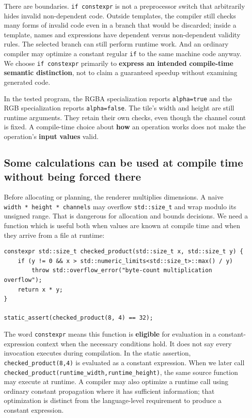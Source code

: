 There are boundaries. \texttt{if\ constexpr} is not a preprocessor switch that arbitrarily hides invalid non-dependent code. Outside templates, the compiler still checks many forms of invalid code even in a branch that would be discarded; inside a template, names and expressions have dependent versus non-dependent validity rules. The selected branch can still perform runtime work. And an ordinary compiler may optimize a constant regular \texttt{if} to the same machine code anyway. We choose \texttt{if\ constexpr} primarily to \textbf{express an intended compile-time semantic distinction}, not to claim a guaranteed speedup without examining generated code.

In the tested program, the RGBA specialization reports \texttt{alpha=true} and the RGB specialization reports \texttt{alpha=false}. The tile's width and height are still runtime arguments. They retain their own checks, even though the channel count is fixed. A compile-time choice about \textbf{how} an operation works does not make the operation's \textbf{input values} valid.

\subsection{Some calculations can be used at compile time without being forced there}\label{05-engine-i-ch005-some-calculations-can-be-used-at-compile-time-without-being-forced-there}

Before allocating or planning, the renderer multiplies dimensions. A naive \texttt{width\ *\ height\ *\ channels} may overflow \texttt{std::size\_t} and wrap modulo its unsigned range. That is dangerous for allocation and bounds decisions. We need a function which is useful both when values are known at compile time and when they arrive from a file at runtime:

\begin{verbatim}
constexpr std::size_t checked_product(std::size_t x, std::size_t y) {
    if (y != 0 && x > std::numeric_limits<std::size_t>::max() / y)
        throw std::overflow_error("byte-count multiplication overflow");
    return x * y;
}

static_assert(checked_product(8, 4) == 32);
\end{verbatim}

The word \texttt{constexpr} means this function is \textbf{eligible} for evaluation in a constant-expression context when the necessary conditions hold. It does not say every invocation executes during compilation. In the static assertion, \texttt{checked\_product(8,4)} is evaluated as a constant expression. When we later call \texttt{checked\_product(runtime\_width,runtime\_height)}, the same source function may execute at runtime. A compiler may also optimize a runtime call using ordinary constant propagation where it has sufficient information; that optimization is distinct from the language-level requirement to produce a constant expression.

